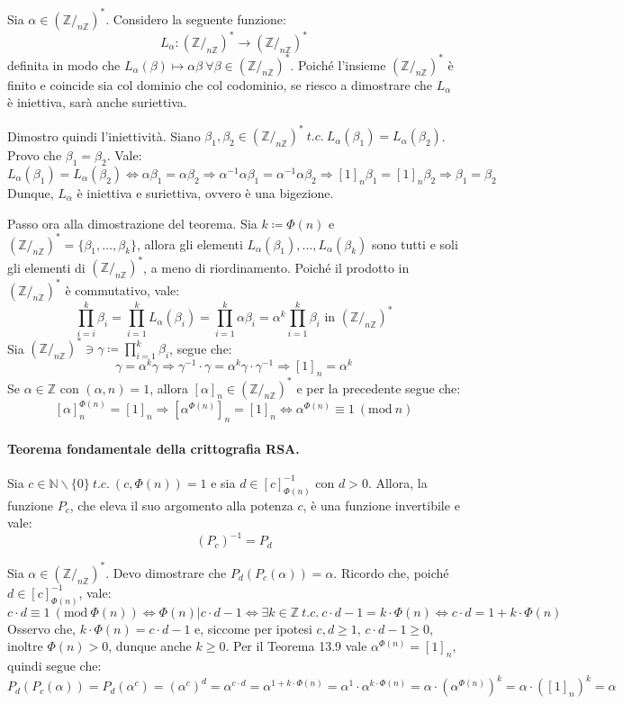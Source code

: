 \documentclass[12pt, a4paper]{report}
\theoremstyle{definition}
\newcommand{\Z}{\mathbb{Z}}
\newcommand{\N}{\mathbb{N}}
\newcommand{\Mod}[1]{\ (\mathrm{mod}\ #1)}
\newcommand{\inv}{(\Z/_{n\Z})^*}
\begin{document}
\begin{demonstration}
    Sia $\alpha\in\inv$. Considero la seguente funzione:
    \[L_\alpha:\inv\to\inv\]
    definita in modo che $L_\alpha(\beta)\mapsto\alpha\beta\ \forall\beta\in\inv$.
    Poiché l'insieme $\inv$ è finito e coincide sia col dominio che col codominio,
    se riesco a dimostrare che $L_\alpha$ è iniettiva, sarà anche suriettiva.

    Dimostro quindi l'iniettività. Siano $\beta_1,\beta_2\in\inv\ t.c.\ L_\alpha
    (\beta_1)=L_\alpha(\beta_2)$. Provo che $\beta_1=\beta_2$. Vale:
    \[L_\alpha(\beta_1)=L_\alpha(\beta_2)\Leftrightarrow\alpha\beta_1=\alpha\beta_2
    \Rightarrow\alpha^{-1}\alpha\beta_1=\alpha^{-1}\alpha\beta_2\Rightarrow
    [1]_n\beta_1=[1]_n\beta_2\Rightarrow\beta_1=\beta_2\]
    Dunque, $L_\alpha$ è iniettiva e suriettiva, ovvero è una bigezione.
    
    Passo ora alla dimostrazione del teorema. Sia $k\coloneqq\Phi(n)$ e
    $\inv=\{\beta_1,\dots,\beta_k\}$, allora gli elementi $L_\alpha(\beta_1),
    \dots,L_\alpha(\beta_k)$ sono tutti e soli gli elementi di $\inv$, a meno di
    riordinamento. Poiché il prodotto in $\inv$ è commutativo, vale:
    \[\prod_{i=i}^k\beta_i=\prod_{i=1}^kL_\alpha(\beta_i)=\prod_{i=1}^k\alpha\beta_i
    =\alpha^k\prod_{i=1}^k\beta_i\text{ in }\inv\]
    Sia $\inv\ni\gamma\coloneqq\prod_{i=1}^k\beta_i$, segue che:
    \[\gamma=\alpha^k\gamma\Rightarrow\gamma^{-1}\cdot\gamma=\alpha^k\gamma\cdot
    \gamma^{-1}\Rightarrow[1]_n=\alpha^k\]
    Se $\alpha\in\Z$ con $(\alpha,n)=1$, allora $[\alpha]_n\in\inv$ e per la
    precedente segue che:
    \[[\alpha]_n^{\Phi(n)}=[1]_n\Rightarrow[\alpha^{\Phi(n)}]_n=[1]_n\Leftrightarrow
    \alpha^{\Phi(n)}\equiv1\Mod{n}\]
\end{demonstration}

\paragraph{Teorema fondamentale della crittografia RSA.}
Sia $c\in\N\backslash\{0\}\ t.c.\ (c,\Phi(n))=1$ e sia $d\in[c]^{-1}_{\Phi(n)}$ con
$d>0$. Allora, la funzione $P_c$, che eleva il suo argomento alla potenza $c$, è
una funzione invertibile e vale:
\[(P_c)^{-1}=P_d\]
\begin{demonstration}
    Sia $\alpha\in\inv$. Devo dimostrare che $P_d(P_c(\alpha))=\alpha$. Ricordo
    che, poiché $d\in[c]^{-1}_{\Phi(n)}$, vale:
    \[c\cdot d\equiv1\Mod{\Phi(n)}\Leftrightarrow
    \Phi(n)|c\cdot d-1\Leftrightarrow\exists k\in\Z\ t.c.\ c\cdot d-1=k\cdot
    \Phi(n)\Leftrightarrow c\cdot d=1+k\cdot\Phi(n)\]
    Osservo che, $k\cdot\Phi(n)=c\cdot d-1$ e, siccome per ipotesi $c,d\geq1$,
    $c\cdot d-1\geq0$, inoltre $\Phi(n)>0$, dunque anche $k\geq0$. Per il Teorema
    13.9 vale $\alpha^{\Phi(n)}=[1]_n$, quindi segue che:
    \[P_d(P_c(\alpha))=P_d(\alpha^c)=(\alpha^c)^d=\alpha^{c\cdot d}=\alpha^{1+
    k\cdot\Phi(n)}=\alpha^1\cdot\alpha^{k\cdot\Phi(n)}=\alpha\cdot(\alpha^
    {\Phi(n)})^k=\alpha\cdot([1]_n)^k=\alpha\]
\end{demonstration}
\end{document}
